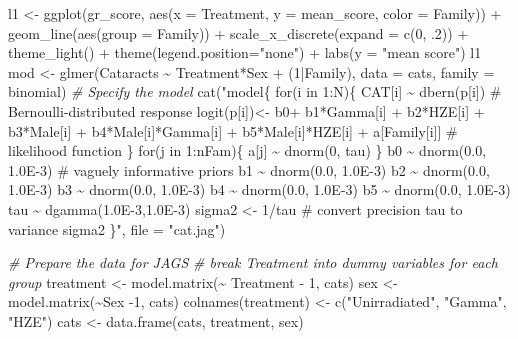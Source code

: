 \documentclass[12pt]{article}
\newenvironment{Shaded}{\begin{snugshade}}{\end{snugshade}}
\newcommand{\AttributeTok}[1]{\textcolor[rgb]{0.77,0.63,0.00}{#1}}
\newcommand{\CommentTok}[1]{\textcolor[rgb]{0.56,0.35,0.01}{\textit{#1}}}
\newcommand{\DecValTok}[1]{\textcolor[rgb]{0.00,0.00,0.81}{#1}}
\newcommand{\FunctionTok}[1]{\textcolor[rgb]{0.00,0.00,0.00}{#1}}
\newcommand{\NormalTok}[1]{#1}
\newcommand{\OtherTok}[1]{\textcolor[rgb]{0.56,0.35,0.01}{#1}}
\newcommand{\SpecialCharTok}[1]{\textcolor[rgb]{0.00,0.00,0.00}{#1}}
\newcommand{\StringTok}[1]{\textcolor[rgb]{0.31,0.60,0.02}{#1}}
\begin{document}
\begin{Shaded}
\begin{Highlighting}[]
\NormalTok{l1 }\OtherTok{\textless{}{-}} \FunctionTok{ggplot}\NormalTok{(gr\_score, }\FunctionTok{aes}\NormalTok{(}\AttributeTok{x =}\NormalTok{ Treatment, }\AttributeTok{y =}\NormalTok{ mean\_score, }\AttributeTok{color =}\NormalTok{ Family)) }\SpecialCharTok{+}
  \FunctionTok{geom\_line}\NormalTok{(}\FunctionTok{aes}\NormalTok{(}\AttributeTok{group =}\NormalTok{ Family)) }\SpecialCharTok{+} 
  \FunctionTok{scale\_x\_discrete}\NormalTok{(}\AttributeTok{expand =} \FunctionTok{c}\NormalTok{(}\DecValTok{0}\NormalTok{, .}\DecValTok{2}\NormalTok{)) }\SpecialCharTok{+}
  \FunctionTok{theme\_light}\NormalTok{() }\SpecialCharTok{+}
  \FunctionTok{theme}\NormalTok{(}\AttributeTok{legend.position=}\StringTok{"none"}\NormalTok{) }\SpecialCharTok{+} 
  \FunctionTok{labs}\NormalTok{(}\AttributeTok{y =} \StringTok{"mean score"}\NormalTok{)}
\NormalTok{l1}
\NormalTok{mod }\OtherTok{\textless{}{-}} \FunctionTok{glmer}\NormalTok{(Cataracts }\SpecialCharTok{\textasciitilde{}}\NormalTok{ Treatment}\SpecialCharTok{*}\NormalTok{Sex }\SpecialCharTok{+}\NormalTok{ (}\DecValTok{1}\SpecialCharTok{|}\NormalTok{Family), }\AttributeTok{data =}\NormalTok{ cats, }\AttributeTok{family =}\NormalTok{ binomial)}
\CommentTok{\# Specify the model}
\FunctionTok{cat}\NormalTok{(}\StringTok{"model\{}
\StringTok{  for(i in 1:N)\{}
\StringTok{    CAT[i] \textasciitilde{} dbern(p[i])     \# Bernoulli{-}distributed response}
\StringTok{    logit(p[i])\textless{}{-} b0+ b1*Gamma[i] + b2*HZE[i] + b3*Male[i] +}
\StringTok{    b4*Male[i]*Gamma[i] + b5*Male[i]*HZE[i] + a[Family[i]]   \# likelihood function}
\StringTok{  \}}
\StringTok{  for(j in 1:nFam)\{}
\StringTok{    a[j] \textasciitilde{} dnorm(0, tau)}
\StringTok{  \}}
\StringTok{  b0 \textasciitilde{} dnorm(0.0, 1.0E{-}3)   \# vaguely informative priors}
\StringTok{  b1 \textasciitilde{} dnorm(0.0, 1.0E{-}3)}
\StringTok{  b2 \textasciitilde{} dnorm(0.0, 1.0E{-}3)}
\StringTok{  b3 \textasciitilde{} dnorm(0.0, 1.0E{-}3)}
\StringTok{  b4 \textasciitilde{} dnorm(0.0, 1.0E{-}3)}
\StringTok{  b5 \textasciitilde{} dnorm(0.0, 1.0E{-}3)}
\StringTok{  tau \textasciitilde{} dgamma(1.0E{-}3,1.0E{-}3)}
\StringTok{  sigma2 \textless{}{-} 1/tau     \# convert precision \textquotesingle{}tau\textquotesingle{} to variance \textquotesingle{}sigma2\textquotesingle{}}
\StringTok{\}"}\NormalTok{, }\AttributeTok{file =} \StringTok{"cat.jag"}\NormalTok{)}

\CommentTok{\# Prepare the data for JAGS}
\CommentTok{\# break Treatment into dummy variables for each group}
\NormalTok{treatment }\OtherTok{\textless{}{-}} \FunctionTok{model.matrix}\NormalTok{(}\SpecialCharTok{\textasciitilde{}}\NormalTok{ Treatment }\SpecialCharTok{{-}} \DecValTok{1}\NormalTok{, cats)}
\NormalTok{sex }\OtherTok{\textless{}{-}} \FunctionTok{model.matrix}\NormalTok{(}\SpecialCharTok{\textasciitilde{}}\NormalTok{Sex }\SpecialCharTok{{-}}\DecValTok{1}\NormalTok{, cats)}
\FunctionTok{colnames}\NormalTok{(treatment) }\OtherTok{\textless{}{-}} \FunctionTok{c}\NormalTok{(}\StringTok{"Unirradiated"}\NormalTok{, }\StringTok{"Gamma"}\NormalTok{, }\StringTok{"HZE"}\NormalTok{)}
\NormalTok{cats }\OtherTok{\textless{}{-}} \FunctionTok{data.frame}\NormalTok{(cats, treatment, sex)}


\end{Highlighting}
\end{Shaded}
\end{document}
